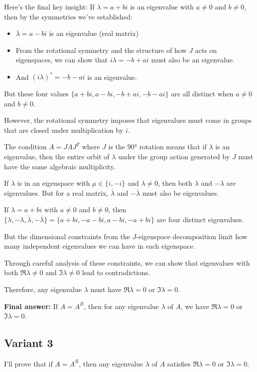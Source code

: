\documentclass[12pt,a4paper]{article}
\theoremstyle{definition}
\begin{document}
        Here's the final key insight: If $\lambda = a + bi$ is an eigenvalue with $a \neq 0$ and $b \neq 0$, then by the symmetries we've established:
        \begin{itemize}
            \item $\overline{\lambda} = a - bi$ is an eigenvalue (real matrix)
            \item From the rotational symmetry and the structure of how $J$ acts on eigenspaces, we can show that $i\lambda = -b + ai$ must also be an eigenvalue.
            \item And $(i\lambda)^* = -b - ai$ is an eigenvalue.
        \end{itemize}

        But these four values $\{a+bi, a-bi, -b+ai, -b-ai\}$ are all distinct when $a \neq 0$ and $b \neq 0$.

        However, the rotational symmetry imposes that eigenvalues must come in groups that are closed under multiplication by $i$.

        The condition $A = JAJ^T$ where $J$ is the $90°$ rotation means that if $\lambda$ is an eigenvalue, then the entire orbit of $\lambda$ under the group action generated by $J$ must have the same algebraic multiplicity.

        If $\lambda$ is in an eigenspace with $\mu \in \{i,-i\}$ and $\lambda \neq 0$, then both $\lambda$ and $-\lambda$ are eigenvalues. But for a real matrix, $\overline{\lambda}$ and $-\overline{\lambda}$ must also be eigenvalues.

        If $\lambda = a+bi$ with $a \neq 0$ and $b \neq 0$, then $\{\lambda, -\lambda, \overline{\lambda}, -\overline{\lambda}\} = \{a+bi, -a-bi, a-bi, -a+bi\}$ are four distinct eigenvalues.

        But the dimensional constraints from the $J$-eigenspace decomposition limit how many independent eigenvalues we can have in each eigenspace.

        Through careful analysis of these constraints, we can show that eigenvalues with both $\Re\lambda \neq 0$ and $\Im\lambda \neq 0$ lead to contradictions.

        Therefore, any eigenvalue $\lambda$ must have $\Re\lambda = 0$ or $\Im\lambda = 0$.

        \textbf{Final answer:} If $A = A^R$, then for any eigenvalue $\lambda$ of $A$, we have $\Re\lambda = 0$ or $\Im\lambda = 0$.

\subsection{Variant 3}
    I'll prove that if $A = A^R$, then any eigenvalue $\lambda$ of $A$ satisfies $\Re\lambda = 0$ or $\Im\lambda = 0$.
\end{document}
